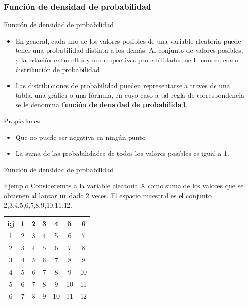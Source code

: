 \documentclass[11pt]{beamer}
\begin{document}
        \subsubsection*{Función de densidad de probabilidad}
        \begin{frame}{Función de densidad de probabilidad}
            \begin{itemize}
                \item En general, cada uno de los valores posibles de una variable aleatoria puede tener una probabilidad distinta a los demás. Al conjunto de valores posibles, y la relación entre ellos y sus respectivas probabilidades, se lo conoce como distribución de probabilidad.
                \item Las distribuciones de probabilidad pueden representarse a través de una tabla, una gráfica o una fórmula, en cuyo caso a tal regla de correspondencia se le denomina \textbf{función de densidad de probabilidad}.
            \end{itemize}
            \begin{block}{Propiedades}
                \begin{itemize}
                    \item Que no puede ser negativa en ningún punto
                    \item La suma de las probabilidades de todos los valores posibles es igual a 1.
                \end{itemize}
            \end{block}
        \end{frame}

        \begin{frame}{Función de densidad de probabilidad}
          \begin{block}{Ejemplo}
             Consideremos a la variable aleatoria X como suma de los valores que se obtienen al lanzar un dado 2 veces. El espacio muestral es el conjunto {2,3,4,5,6,7,8,9,10,11,12}.
          \end{block}
          \begin{center}
              \begin{tabular}{c|cccccc}
                 i;j & 1 & 2 & 3 & 4 & 5 & 6 \\
                  \hline
                  1 & 2 & 3 & 4 & 5 & 6 & 7 \\
                  2 & 3 & 4 & 5 & 6 & 7 & 8 \\
                  3 & 4 & 5 & 6 & 7 & 8 & 9 \\
                  4 & 5 & 6 & 7 & 8 & 9 & 10 \\
                  5 & 6 & 7 & 8 & 9 & 10 & 11 \\
                  6 & 7 & 8 & 9 & 10 & 11 & 12 \\
              \end{tabular}
          \end{center}
        \end{frame}
\end{document}
